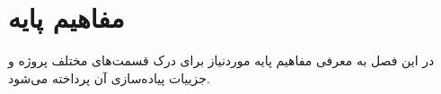 \let\cleardoublepage\clearpage
\chapter{مفاهیم پایه}
در این فصل به معرفی مفاهیم پایه موردنیاز برای درک قسمت‌های مختلف پروژه و جزییات پیاده‌سازی آن پرداخته می‌شود.



\newpage



\newpage

